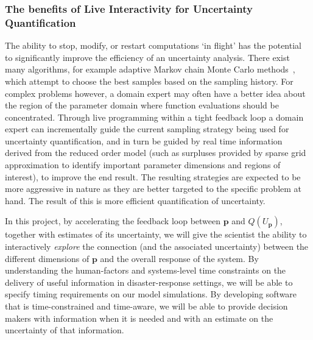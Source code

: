 \subsubsection*{The benefits of Live Interactivity for Uncertainty
  Quantification}

The ability to stop, modify, or restart computations `in flight' has
the potential to significantly improve the efficiency of an
uncertainty analysis. There exist many algorithms, for example
adaptive Markov chain Monte Carlo methods~\parencite{GilksEtal1994}, 
which attempt to choose the best samples based on the sampling
history. For complex problems however, a domain expert
may often have
a better idea about the region of the parameter domain where function
evaluations should be concentrated. Through live programming within a
tight feedback loop a domain expert can incrementally guide the
current sampling strategy being used for uncertainty 
quantification, and in turn be guided by 
real time information derived from the reduced order model 
(such as surpluses
provided by sparse grid approximation to 
identify important parameter dimensions and regions of interest), 
to improve the end result. The resulting strategies are expected to be
more aggressive in nature as they are better targeted to the specific
problem at hand. The result of this is more efficient quantification of
uncertainty.

In this project, by accelerating the feedback loop between
$\mathbf{p}$ and $Q(U_{\mathbf{p}})$, together with estimates of its
uncertainty, we will give the scientist the ability to interactively
\emph{explore} the connection (and the associated uncertainty) between
the different dimensions of $\mathbf{p}$ and the overall response of
the system. By understanding the human-factors and systems-level time
constraints on the delivery of useful information in disaster-response
settings, we will be able to specify timing requirements on our model
simulations. By developing software that is time-constrained and
time-aware, we will be able to provide decision makers with
information when it is needed and with an estimate on the uncertainty
of that information.


